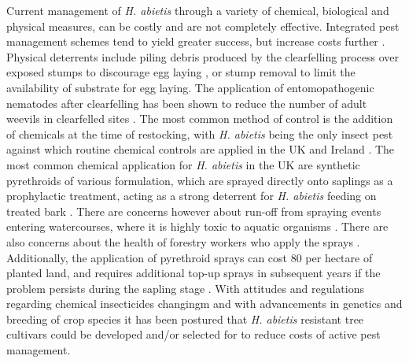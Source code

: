 \documentclass[a4paper, 11pt]{article}
\newcommand{\textapprox}{\raisebox{0.5ex}{\texttildelow}}
\begin{document}
Current management of \textit{H. abietis} through a variety of chemical, biological and physical measures, can be costly and are not completely effective. Integrated pest management schemes tend to yield greater success, but increase costs further \citep{Willoughby2004}. Physical deterrents include piling debris produced by the clearfelling process over exposed stumps to discourage egg laying \citep{Rahman2015}, or stump removal to limit the availability of substrate for egg laying. The application of entomopathogenic nematodes after clearfelling has been shown to reduce the number of adult weevils in clearfelled sites \citep{Dillon2006, Kapranas2017, Williams2013}. The most common method of control is the addition of chemicals at the time of restocking, with \textit{H. abietis} being the only insect pest against which routine chemical controls are applied in the UK and Ireland \citep{Willoughby2004, Willoughby2017}. The most common chemical application for \textit{H. abietis} in the UK are synthetic pyrethroids of various formulation, which are sprayed directly onto saplings as a prophylactic treatment, acting as a strong deterrent for \textit{H. abietis} feeding on treated bark \citep{Rose2005}. There are concerns however about run-off from spraying events entering watercourses, where it is highly toxic to aquatic organisms \citep{Willoughby2017, Mian1992, Antwi2015}. There are also concerns about the health of forestry workers who apply the sprays \citep{Rose2002}. Additionally, the application of pyrethroid sprays can cost \textapprox{}\textsterling{}80 per hectare of planted land, and requires additional top-up sprays in subsequent years if the problem persists during the sapling stage \citep{Willoughby2017}. With attitudes and regulations regarding chemical insecticides changingm and with advancements in genetics and breeding of crop species it has been postured that \textit{H. abietis} resistant tree cultivars could be developed and/or selected for to reduce costs of active pest management.
\end{document}
